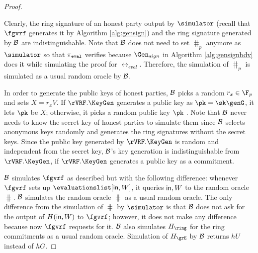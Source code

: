 \begin{proof}
\begin{algorithm}
	\end{algorithm}
	
	
	Clearly, the ring signature of an honest party output by $ \simulator $ (recall that $ \fgvrf$ generates it by Algorithm \ref{alg:gensign}) and the ring signature generated by $ \mathcal{B} $ are indistinguishable. Note that $ \mathcal{B} $ does not need to set $ \hash_p $ anymore as $ \simulator $ so that $ \pi_{\mathtt{eval}} $ verifies because $ \Gen_{sign} $ in Algorithm \ref{alg:gensignbdv} does it while simulating the proof for $ \rel_{eval} $. Therefore, the simulation of $ \hash_p $ is simulated as a usual random oracle by $ \mathcal{B} $.
	
	In order to generate the public keys of honest parties, $ \mathcal{B} $ picks a random $ r_x\in \FF_p $ and sets $ X =r_xV$. If $ \rVRF.\KeyGen $  generates a public key as $ \pk = \sk \genG $, it lets $ \pk $ be $ X $; otherwise, it picks a random public key $ \pk $ .
	Note that $ \mathcal{B}$  never needs to know the secret key of honest parties to simulate them since $ \mathcal{B} $ selects anonymous keys randomly  and generates the ring signatures  without the secret keys. Since the public key generated by $ \rVRF.\KeyGen $ is random and independent from the secret key, $ \mathcal{B} $'s key generation is indistinguishable from $ \rVRF.\KeyGen $, if $\rVRF.\KeyGen $  generates a public key as a commitment.
	
	
	$ \mathcal{B} $ simulates $ \fgvrf $ as described but with the following difference: whenever $ \fgvrf $ sets up $ \evaluationslist[\msg,W] $, it queries $ \mathsf{in},W $ to the random oracle $ \hash $. $ \mathcal{B} $ simulates the random oracle $ \hash $  as a usual random oracle.
	The only difference from the simulation of $ \hash $ by $ \simulator $ is that $ \mathcal{B} $ does not ask for the output of $ H(\mathsf{in},W) $ to $ \fgvrf $; however, it does not make any difference because now $\fgvrf $ requests for it.  
	$ \mathcal{B} $ also simulates $ \hash_\ring $ for the ring commitments as a usual random oracle. 			
	Simulation of $ \hashG $ by $ \mathcal{B} $ returns $ hU $ instead of $ hG $. 
	

\end{proof}
